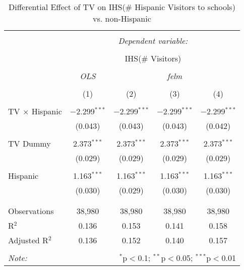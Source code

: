 
\begin{table}[!htbp] \centering 
  \caption{Differential Effect of TV on IHS(\# Hispanic Visitors to schools) vs. non-Hispanic} 
  \label{} 
\begin{tabular}{@{\extracolsep{-2pt}}lcccc} 
\\[-1.8ex]\hline 
\hline \\[-1.8ex] 
 & \multicolumn{4}{c}{\textit{Dependent variable:}} \\ 
\cline{2-5} 
\\[-1.8ex] & \multicolumn{4}{c}{IHS(\# Visitors)} \\ 
\\[-1.8ex] & \textit{OLS} & \multicolumn{3}{c}{\textit{felm}} \\ 
\\[-1.8ex] & (1) & (2) & (3) & (4)\\ 
\hline \\[-1.8ex] 
 TV $\times$ Hispanic & $-$2.299$^{***}$ & $-$2.299$^{***}$ & $-$2.299$^{***}$ & $-$2.299$^{***}$ \\ 
  & (0.043) & (0.043) & (0.043) & (0.042) \\ 
  & & & & \\ 
 TV Dummy & 2.373$^{***}$ & 2.373$^{***}$ & 2.373$^{***}$ & 2.373$^{***}$ \\ 
  & (0.029) & (0.029) & (0.029) & (0.029) \\ 
  & & & & \\ 
 Hispanic & 1.163$^{***}$ & 1.163$^{***}$ & 1.163$^{***}$ & 1.163$^{***}$ \\ 
  & (0.030) & (0.029) & (0.030) & (0.030) \\ 
  & & & & \\ 
\hline \\[-1.8ex] 
Observations & 38,980 & 38,980 & 38,980 & 38,980 \\ 
R$^{2}$ & 0.136 & 0.153 & 0.141 & 0.158 \\ 
Adjusted R$^{2}$ & 0.136 & 0.152 & 0.140 & 0.157 \\ 
\hline 
\hline \\[-1.8ex] 
\textit{Note:}  & \multicolumn{4}{r}{$^{*}$p$<$0.1; $^{**}$p$<$0.05; $^{***}$p$<$0.01} \\ 
\end{tabular} 
\end{table} 
